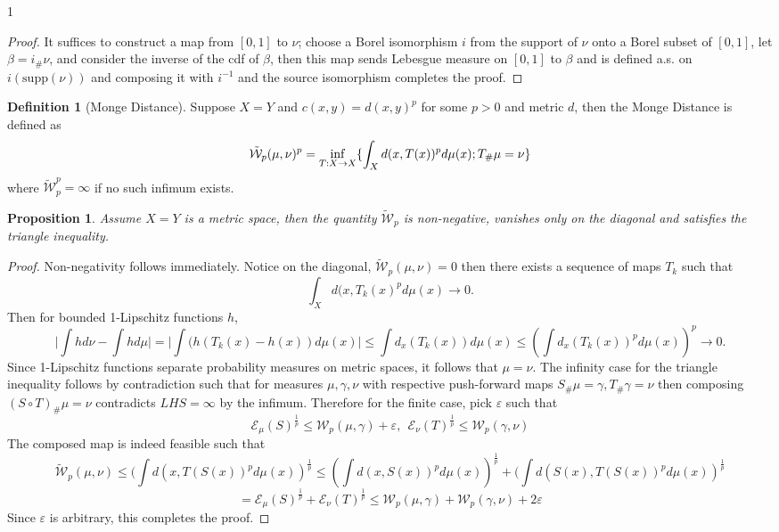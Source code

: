 \documentclass[12pt]{article}
\newtheorem{proposition}[theorem]{Proposition}
\theoremstyle{definition}
\newtheorem{definition}[theorem]{Definition}
\theoremstyle{plain}
\begin{document}
\begin{spacing}{1}
\begin{proof}
    It suffices to construct a map from $[0, 1]$ to $\nu$; choose a Borel isomorphism $i$ from the support of $\nu$ onto a Borel subset of $[0, 1]$, let $\beta = i_\#\nu$, and consider the inverse of the cdf of $\beta$, then this map sends Lebesgue measure on $[0, 1]$ to $\beta$ and is defined a.s. on $i(\text{supp}(\nu))$ and composing it with $i^{-1}$ and the source isomorphism completes the proof. \qedhere
\end{proof}

\begin{definition}[Monge Distance]
    Suppose $X = Y$ and $c(x, y) = d(x, y)^p$ for some $p > 0$ and metric $d$, then the Monge Distance is defined as 
    \[
    \tilde{\mathcal{W}}_p(\mu, \nu)^p = \inf_{T: X \rightarrow X} \{\displaystyle \displaystyle \int_X d(x, T(x))^pd\mu(x); T_\#\mu = \nu\}
    \]
    where $\tilde{\mathcal{W}}_p^p = \infty$ if no such infimum exists.
\end{definition}

\begin{proposition}
    Assume $X = Y$ is a metric space, then the quantity $\tilde{\mathcal{W}}_p$ is non-negative, vanishes only on the diagonal and satisfies the triangle inequality.
\end{proposition}

\begin{proof}
    Non-negativity follows immediately. Notice on the diagonal, $\tilde{\mathcal{W}}_p(\mu, \nu) = 0$ then there exists a sequence of maps $T_k$ such that 
    \[
    \displaystyle \int_X d(x, T_k(x)^pd\mu(x) \rightarrow 0.
    \]
    Then for bounded 1-Lipschitz functions $h$,
    \[
    \bigg \lvert \displaystyle \int hd\nu - \displaystyle \int h d\mu \rvert = \bigg \lvert \displaystyle \int (h(T_k(x) - h(x))d\mu(x) \bigg \rvert \leq \int d_x(T_k(x)) d\mu(x) \leq (\int d_x(T_k(x))^p d\mu(x))^p \rightarrow 0.
    \]
    Since 1-Lipschitz functions separate probability measures on metric spaces, it follows that $\mu = \nu$.
    \newline
    \newline
    The infinity case for the triangle inequality follows by contradiction such that for measures $\mu, \gamma, \nu$ with respective push-forward maps $S_\#\mu = \gamma, T_\# \gamma = \nu$ then composing $(S \circ T)_\#\mu = \nu$ contradicts $LHS = \infty$ by the infimum. Therefore for the finite case, pick $\varepsilon$ such that
    \[
    \mathcal{E}_\mu(S)^\frac{1}{p} \leq \mathcal{W}_p(\mu, \gamma) + \varepsilon, \ \ \mathcal{E}_\nu(T)^\frac{1}{p} \leq \mathcal{W}_p(\gamma, \nu)    \]
    The composed map is indeed feasible such that
    \[
    \tilde{\mathcal{W}}_p(\mu, \nu) \leq (\displaystyle \int d(x, T(S(x))^pd\mu(x))^\frac{1}{p} \leq (\displaystyle \int d(x, S(x))^pd\mu(x))^\frac{1}{p} + (\displaystyle \int d(S(x), T(S(x))^pd\mu(x))^\frac{1}{p}
    \]
    \[
    = \mathcal{E}_\mu(S)^\frac{1}{p} + \mathcal{E}_\nu(T)^\frac{1}{p} \leq\mathcal{W}_p(\mu, \gamma) + \mathcal{W}_p(\gamma, \nu) + 2\varepsilon
    \]
    Since $\varepsilon$ is arbitrary, this completes the proof. 
\end{proof}


\end{spacing}
\end{document}
